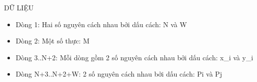DỮ LIỆU
\begin{itemize}
	\item     Dòng 1: Hai số nguyên cách nhau bởi dấu cách: N và W   
	\item     Dòng 2: Một số thực: M   
	\item     Dòng 3..N+2: Mỗi dòng gồm 2 số nguyên cách nhau bởi dấu cách: x\_i         và y\_i   
	\item     Dòng N+3..N+2+W: 2 số nguyên cách nhau bởi dấu cách: Pi và Pj   
\end{itemize}